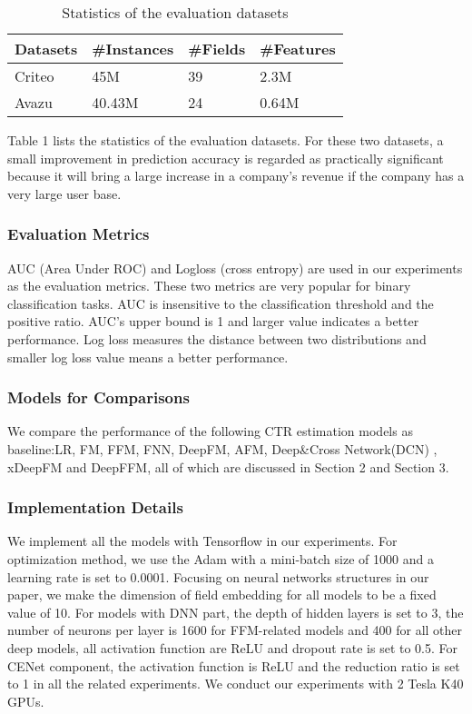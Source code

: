 \documentclass{article}
\begin{document}
\begin{table}[]
\centering
\caption{Statistics of the evaluation datasets}
\label{table:t1}
\begin{tabular}{|l|l|l|l|}
\hline
Datasets & \#Instances & \#Fields & \#Features \\ \hline
Criteo   & 45M        & 39      & 2.3M       \\ \hline
Avazu    & 40.43M     & 24      & 0.64M     \\ \hline
\end{tabular}
\end{table}

Table 1 lists the statistics of the evaluation datasets. For these two datasets, a small improvement in prediction accuracy is regarded as practically significant because it will bring a large increase in a company's revenue if the company has a very large user base.

\subsubsection{Evaluation Metrics} 	AUC (Area Under ROC) and Logloss (cross entropy) are used in our experiments as the evaluation metrics. These two metrics are very popular for binary classification tasks. AUC is insensitive to the classification threshold and the positive ratio. AUC's upper bound is 1 and larger value indicates a better performance. Log loss measures the distance between two distributions and smaller log loss value means a better performance.

\subsubsection{Models for Comparisons}
We compare the performance of the following CTR estimation models as baseline:LR, FM, FFM, FNN, DeepFM, AFM, Deep\&Cross Network(DCN) , xDeepFM and DeepFFM, all of which are discussed in Section 2 and Section 3. 

\subsubsection{Implementation Details}
We implement all the models with Tensorflow in our experiments. For optimization method, we use the Adam with a mini-batch size of 1000 and a learning rate is set to 0.0001.  Focusing on neural networks structures in our paper, we make the dimension of field embedding for all models to be a fixed value of 10. For models with DNN part, the depth of hidden layers is set to 3, the number of neurons per layer is 1600 for FFM-related models and 400 for all other deep models, all activation function are ReLU and dropout rate is set to 0.5. For CENet component, the activation function is ReLU and the reduction ratio is set to 1 in all the related experiments. We conduct our experiments with 2 Tesla K40 GPUs.
\end{document}
